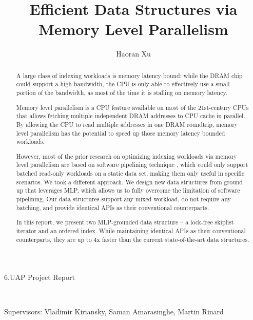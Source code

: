 \documentclass[11pt, usletter]{article}
\begin{document}
\title{Efficient Data Structures via Memory Level Parallelism}
\author{Haoran Xu}
\date{}

\maketitle

\begin{center}

6.UAP Project Report

\

Supervisors: 
Vladimir Kiriansky,
Saman Amarasinghe, 
Martin Rinard

\end{center}

\vspace{1cm}

\begin{abstract}

A large class of indexing workloads is memory latency bound: 
while the DRAM chip could support a high bandwidth, 
the CPU is only able to effectively use a small portion of the bandwidth, 
as most of the time it is stalling on memory latency.

Memory level parallelism is a CPU feature available on most of the 21st-century CPUs 
that allows fetching multiple independent DRAM addresses to CPU cache in parallel. 
By allowing the CPU to read multiple addresses in one DRAM roundtrip,
memory level parallelism has the potential to speed up those memory latency bounded workloads.

However, most of the prior research on optimizing indexing workloads via memory level parallelism 
are based on software pipelining technique \cite{hashjoin_icde04, fast_sigmod10, amac_vldb15, operatorfusion_vldb17, cimple_pact18}, 
which could only support batched read-only workloads on a static data set, 
making them only useful in specific scenarios. 
We took a different approach. We design new data structures from ground up that leverages MLP, 
which allows us to fully overcome the limitation of software pipelining. 
Our data structures support any mixed workload, do not require any batching, 
and provide identical APIs as their conventional counterparts.

In this report, we present two MLP-grounded data structure -- a lock-free skiplist iterator 
and an ordered index. 
While maintaining identical APIs as their conventional counterparts, 
they are up to 4x faster than the current state-of-the-art data structures. 

\end{abstract}
\end{document}
